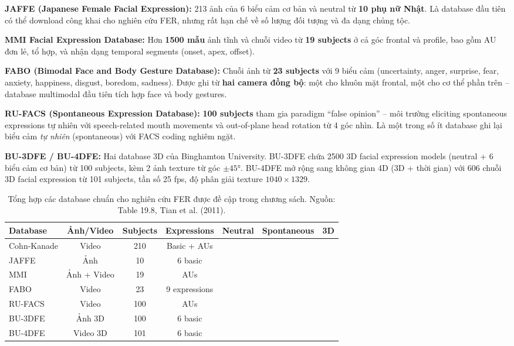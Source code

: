 \documentclass[12pt,a4paper]{article}
\newcommand{\cmark}{\ding{51}}
\newcommand{\xmark}{\ding{55}}
\let\oldtextbf\textbf
\renewcommand{\textbf}[1]{\oldtextbf{\textcolor{hcmublue}{#1}}}
\begin{document}
\textbf{JAFFE (Japanese Female Facial Expression):} 213 ảnh của 6 biểu cảm cơ bản và neutral từ \textbf{10 phụ nữ Nhật}. Là database đầu tiên có thể download công khai cho nghiên cứu FER, nhưng rất hạn chế về số lượng đối tượng và đa dạng chủng tộc.

\textbf{MMI Facial Expression Database:} Hơn \textbf{1500 mẫu} ảnh tĩnh và chuỗi video từ \textbf{19 subjects} ở cả góc frontal và profile, bao gồm AU đơn lẻ, tổ hợp, và nhận dạng temporal segments (onset, apex, offset).

\textbf{FABO (Bimodal Face and Body Gesture Database):} Chuỗi ảnh từ \textbf{23 subjects} với 9 biểu cảm (uncertainty, anger, surprise, fear, anxiety, happiness, disgust, boredom, sadness). Được ghi từ \textbf{hai camera đồng bộ}: một cho khuôn mặt frontal, một cho cơ thể phần trên -- database multimodal đầu tiên tích hợp face và body gestures.

\textbf{RU-FACS (Spontaneous Expression Database):} \textbf{100 subjects} tham gia paradigm ``false opinion'' -- môi trường eliciting spontaneous expressions tự nhiên với speech-related mouth movements và out-of-plane head rotation từ 4 góc nhìn. Là một trong số ít database ghi lại biểu cảm \textit{tự nhiên} (spontaneous) với FACS coding nghiêm ngặt.

\textbf{BU-3DFE / BU-4DFE:} Hai database 3D của Binghamton University. BU-3DFE chứa 2500 3D facial expression models (neutral + 6 biểu cảm cơ bản) từ 100 subjects, kèm 2 ảnh texture từ góc $\pm45°$. BU-4DFE mở rộng sang không gian 4D (3D + thời gian) với 606 chuỗi 3D facial expression từ 101 subjects, tần số 25 fps, độ phân giải texture $1040 \times 1329$.

\begin{table}[H]
\centering
\small
\begin{tabular}{|l|c|c|c|c|c|c|}
\hline
\textbf{Database} & \textbf{Ảnh/Video} & \textbf{Subjects} & \textbf{Expressions} & \textbf{Neutral} & \textbf{Spontaneous} & \textbf{3D} \\ \hline
Cohn-Kanade & Video & 210 & Basic + AUs & \cmark & \xmark & \xmark \\ \hline
JAFFE & Ảnh & 10 & 6 basic & \cmark & \xmark & \xmark \\ \hline
MMI & Ảnh + Video & 19 & AUs & \cmark & \xmark & \xmark \\ \hline
FABO & Video & 23 & 9 expressions & \cmark & \xmark & \xmark \\ \hline
RU-FACS & Video & 100 & AUs & \cmark & \cmark & \xmark \\ \hline
BU-3DFE & Ảnh 3D & 100 & 6 basic & \cmark & \xmark & \cmark \\ \hline
BU-4DFE & Video 3D & 101 & 6 basic & \cmark & \xmark & \cmark \\ \hline
\end{tabular}
\caption{Tổng hợp các database chuẩn cho nghiên cứu FER được đề cập trong chương sách. Nguồn: Table 19.8, Tian et al. (2011).}
\label{tab:databases}
\end{table}
\end{document}
